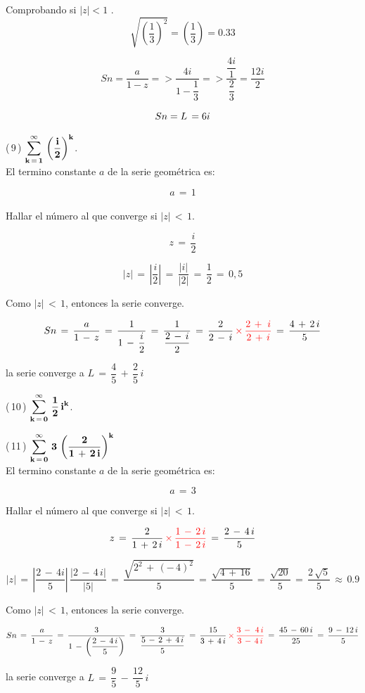 \documentclass[a4paper,11pt,openany]{book}
\begin{document}
\providecommand{\abs}[1]{\lvert#1\rvert} 

Comprobando si $\abs{z} < 1$
.\\

$$\sqrt{\left( \dfrac{1}{3} \right)^{2}}= \left( \dfrac{1}{3} \right) = 0.33$$

$$ Sn = \dfrac{a}{1-z} => \dfrac{4i}{1-\dfrac{1}{3}} => \dfrac{\dfrac{4i}{1}}{\dfrac{2}{3}} = \dfrac{12i}{2}$$

$$ Sn = \mathnormal{L}\,= 6i $$

\textcolor{ao(english)}{(\,9\,)} $\bf{\displaystyle\sum\limits_{k\,=\,1}^{\infty}\,\left(\dfrac{i}{2}\right)^{k}}$.\\

\textcolor{ao(english)}{} El termino constante $a$ de la serie geométrica es:

$$a\,=\,1$$\\

\textcolor{ao(english)}{} Hallar el número al que converge si $|z|\,<\,1$.

$$z\,=\,\dfrac{i}{2}$$

$$|z|\,=\,\left|\dfrac{i}{2}\right|\,=\,\dfrac{|i|}{|2|}\,=\,\dfrac{1}{2}\,=\,0,5$$

\textcolor{ao(english)}{} Como $|z|\,<\,1$, entonces la serie converge.

$$Sn\,=\,\dfrac{a}{1\,-\,z}\,=\,\dfrac{1}{1\,-\,\dfrac{i}{2}}\,=\,\dfrac{1}{\dfrac{2\,-\,i}{2}}\,=\,\dfrac{2}{2\,-\,i}\,\textcolor{red}{\times\,\dfrac{2\,+\,\,i}{2\,+\,i}}\,=\,\dfrac{4\,+\,2\,i}{5}$$

la serie converge a $L\,=\,\dfrac{4}{5}\,+\,\dfrac{2}{5}\,i$





\textcolor{ao(english)}{(\,10\,)} $\bf{\displaystyle\sum\limits_{k\,=\,0}^{\infty}\,\dfrac{1}{2}\,i^{k}}$.

\textcolor{ao(english)}{(\,11\,)} $\bf{\displaystyle\sum\limits_{k\,=\,0}^{\infty}\,3\,\left(\dfrac{2}{1\,+\,2\,i}\right)^{k}}$\\

\textcolor{ao(english)}{} El termino constante $a$ de la serie geométrica es:

$$a\,=\,3$$

\textcolor{ao(english)}{} Hallar el número al que converge si $|z|\,<\,1$.

$$z\,=\,\dfrac{2}{1\,+\,2\,i}\,\textcolor{red}{\times\,\dfrac{1\,-\,2\,i}{1\,-\,2\,i}}\,=\,\dfrac{2\,-\,4\,i}{5}$$

$$|z|\,=\,\left|\dfrac{2\,-\,4i}{5}\right|\,\dfrac{|2\,-\,4\,i|}{|5|}\,=\,\dfrac{\sqrt{2^{2}\,+\,(-\,4)^{2}}}{5}\,=\,\dfrac{\sqrt{4\,+\,16}}{5}\,=\,\dfrac{\sqrt{20}}{5}\,=\,\dfrac{2\,\sqrt{5}}{5}\,\approx\,0.9$$

\textcolor{ao(english)}{} Como $|z|\,<\,1$, entonces la serie converge.

$$Sn\,=\,\dfrac{a}{1\,-\,z}\,=\,\dfrac{3}{1\,-\,\left(\dfrac{2\,-\,4\,i}{5}\right)}\,=\,\dfrac{3}{\dfrac{5\,-\,2\,+\,4\,i}{5}}\,=\,\dfrac{15}{3\,+\,4\,i}\,\textcolor{red}{\times\,\dfrac{3\,-\,\,4\,i}{3\,-\,4\,i}}\,=\,\dfrac{45\,-\,60\,i}{25}\,=\,\dfrac{9\,-\,12\,i}{5}$$

la serie converge a $L\,=\,\dfrac{9}{5}\,-\,\dfrac{12}{5}\,i$
\end{document}
